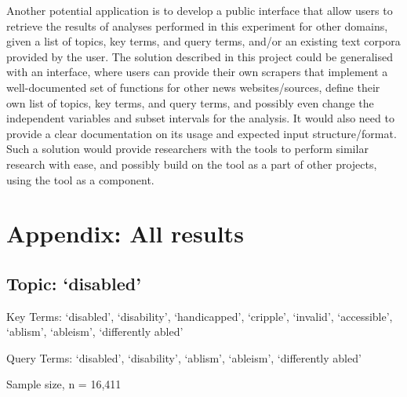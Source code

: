 \documentclass{report}
\begin{document}
Another potential application is to develop a public interface that allow users to retrieve the results of analyses performed in this experiment for other domains, given a list of topics, key terms, and query terms, and/or an existing text corpora provided by the user.
The solution described in this project could be generalised with an interface, where users can provide their own scrapers that implement a well-documented set of functions for other news websites/sources, define their own list of topics, key terms, and query terms, and possibly even change the independent variables and subset intervals for the analysis.
It would also need to provide a clear documentation on its usage and expected input structure/format.
Such a solution would provide researchers with the tools to perform similar research with ease, and possibly build on the tool as a part of other projects, using the tool as a component.

\appendix
{}  %

\printbibliography[heading=bibintoc]

\chapter{Appendix: All results}  %

\newpage
\section{Topic: `disabled'}
Key Terms: `disabled', `disability', `handicapped', `cripple', `invalid', `accessible', `ablism', `ableism', `differently abled'

\noindent Query Terms: `disabled', `disability', `ablism', `ableism', `differently abled'

\noindent Sample size, n = 16,411
\end{document}
